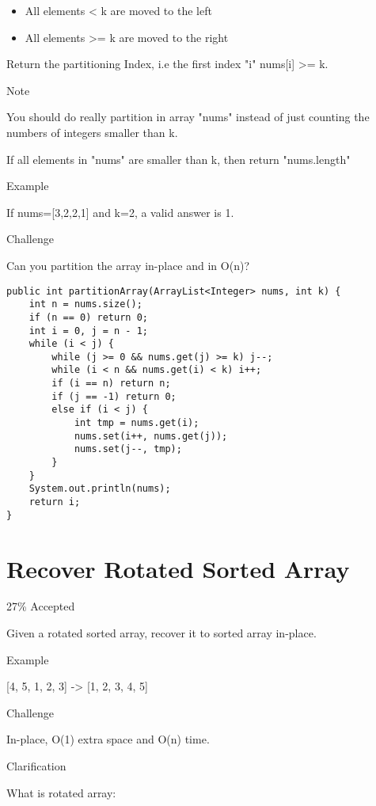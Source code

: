 \documentclass[12pt]{book}
\begin{document}
\begin{itemize}
\item All elements < k are moved to the left

\item All elements >= k are moved to the right
\end{itemize}

Return the partitioning Index, i.e the first index "i" nums[i] >= k.

Note

You should do really partition in array "nums" instead of just counting the numbers of integers smaller than k.

If all elements in "nums" are smaller than k, then return "nums.length"

Example

If nums=[3,2,2,1] and k=2, a valid answer is 1.

Challenge

Can you partition the array in-place and in O(n)?
\lstset{language=java,label= ,caption= ,numbers=none}
\begin{lstlisting}
public int partitionArray(ArrayList<Integer> nums, int k) {
    int n = nums.size();
    if (n == 0) return 0;
    int i = 0, j = n - 1;
    while (i < j) {
        while (j >= 0 && nums.get(j) >= k) j--;
        while (i < n && nums.get(i) < k) i++;
        if (i == n) return n;
        if (j == -1) return 0;
        else if (i < j) {
            int tmp = nums.get(i);
            nums.set(i++, nums.get(j));
            nums.set(j--, tmp);
        }
    }
    System.out.println(nums);
    return i;
}
\end{lstlisting}
\chapter{Recover Rotated Sorted Array}
\label{sec-48}

27\% Accepted

Given a rotated sorted array, recover it to sorted array in-place.

Example

[4, 5, 1, 2, 3] -> [1, 2, 3, 4, 5]

Challenge

In-place, O(1) extra space and O(n) time.

Clarification

What is rotated array:
\end{document}
